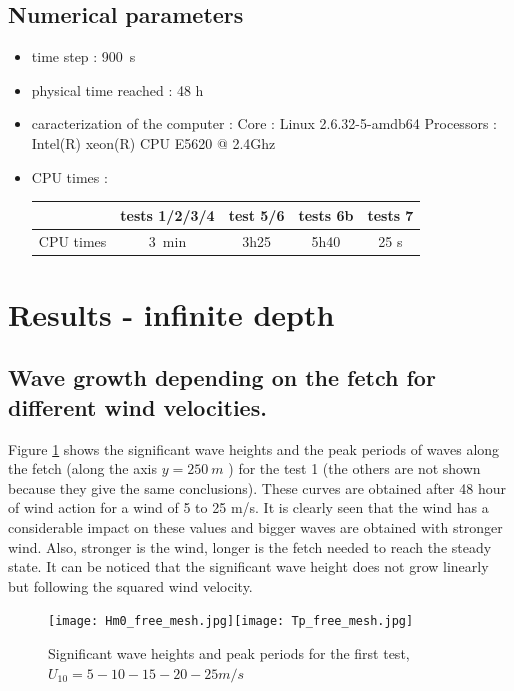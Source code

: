 \subsection{Numerical parameters}
\begin{itemize}
\item time step : 900~s
\item physical time reached : 48 h
\item caracterization of the computer : \subitem Core : Linux 2.6.32-5-amdb64 \subitem Processors : Intel(R)
xeon(R) CPU E5620 @ 2.4Ghz
\item CPU times : \\
\begin{tabular}{ccccc}
\toprule
\toprule
 & \textbf{tests 1/2/3/4} & \textbf{test 5/6} & \textbf{tests 6b} & \textbf{tests 7}\\
\midrule
CPU times & 3~min & 3h25 & 5h40 & 25 s \\
\bottomrule
\bottomrule
\end{tabular}
\end{itemize}

\section{Results - infinite depth }
\subsection{Wave growth depending on the fetch for different wind velocities.}
Figure \ref{hsfet} shows the significant wave heights and the peak periods of waves along the fetch (along the axis $ y = 250~m$ ) for the test 1 (the others are not shown because they give the same conclusions). These curves are obtained after 48 hour of wind action for a wind of 5 to 25 m/s. It is clearly seen that the wind has a considerable impact on these values and bigger waves are obtained with stronger wind. Also, stronger is the wind, longer is the fetch needed to reach the steady state. It can be noticed that the significant wave height does not grow linearly but following the squared wind velocity.
\begin{figure}[H]
  \centering
  	\texttt{[image: Hm0\_free\_mesh.jpg]}\texttt{[image: Tp\_free\_mesh.jpg]}
      \caption{Significant wave heights and peak periods for the first test, $U_{10} = 5 - 10 - 15 - 20 - 25 m/s$}
\label{hsfet}
\end{figure}
